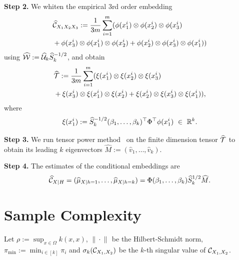 \documentclass{article}
\begin{document}
{\bf Step 2.} We whiten the empirical 3rd order embedding
\begin{align*}
  &\widehat {\mathcal{C}}_{X_1 X_2 X_3}:= \frac{1}{3m}\sum_{i=1}^{m} (\phi(x_1^i) \otimes \phi(x_2^i) \otimes \phi(x_3^i) \\
  &+ \phi(x_3^i) \otimes \phi(x_1^i) \otimes \phi(x_2^i) + \phi(x_2^i) \otimes \phi(x_3^i) \otimes \phi(x_1^i))
\end{align*}
using $\widehat {\mathcal{W}}:= \widehat {\mathcal{U}}_k \widehat S_k^{-1/2}$, and obtain
\begin{align*}
  &\widehat {{\mathcal{T}}} := \frac{1}{3m}\sum_{i=1}^m (\xi(x_1^i) \otimes \xi(x_2^i) \otimes \xi(x_3^i) \\
  &+ \xi(x_3^i) \otimes \xi(x_1^i) \otimes \xi(x_2^i) + \xi(x_2^i) \otimes \xi(x_3^i) \otimes \xi(x_1^i)),
\end{align*}
where
$$
	\xi(x_1^i) := \widehat S_k^{-1/2} (\beta_1,\ldots,\beta_k)^\top \Phi^\top \phi(x_1^i)~ \in~\mathbb{R}^k.
$$

{\bf Step 3.} We run tensor power method~\cite{AnandkumarEtal:community12} on the finite dimension tensor $\widehat {{\mathcal{T}}}$ to obtain its leading $k$ eigenvectors $\widehat M:=(\widehat v_1,\ldots,\widehat v_k)$.

{\bf Step 4.} The estimates of the conditional embeddings are
\begin{align*}
  \widehat {\mathcal{C}}_{X|H} = (\widehat \mu_{X|h=1},\ldots, \widehat \mu_{X|h=k}) = \Phi (\beta_1,\ldots,\beta_k) \widehat  S_k^{1/2} \widehat M.
\end{align*}

\section{Sample Complexity}

Let $\rho:=\sup_{x \in \Omega} k(x,x)$,   $\| \cdot\|_{}$ be the Hilbert-Schmidt norm, $\pi_{\min}:=\min_{i\in [k]} \pi_i$ and $\sigma_k(\mathcal{C}_{X_1, X_2})$ be the $k$-th singular value of $\mathcal{C}_{X_1, X_2}$.

\end{document}
